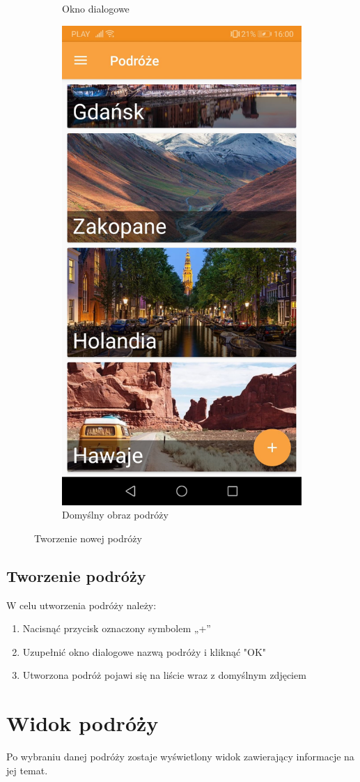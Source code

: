 \documentclass[10pt,twoside,a4paper]{report}
\begin{document}
\begin{figure}[h]
\begin{subfigure}{0.3\textwidth}
\caption{Okno dialogowe}
\label{fig:createNewTravel}
\end{subfigure}
\begin{subfigure}{0.3\textwidth}
\centering
\includegraphics[width=0.8\linewidth, width=5cm]{defaultImage}
\caption{Domyślny obraz podróży}
\label{fig:defaultImage}
\end{subfigure}
\caption{Tworzenie nowej podróży}
\label{fig:podrecznik3}
\end{figure}
\FloatBarrier

\subsection{Tworzenie podróży}
W celu utworzenia podróży należy:
\begin{enumerate}
\item Nacisnąć przycisk oznaczony symbolem „+”
\item Uzupełnić okno dialogowe nazwą podróży i kliknąć "OK"
\item Utworzona podróż pojawi się na liście wraz z domyślnym zdjęciem
\end{enumerate}


\section{Widok podróży}
Po wybraniu danej podróży zostaje wyświetlony widok zawierający informacje na jej temat.
\end{document}
